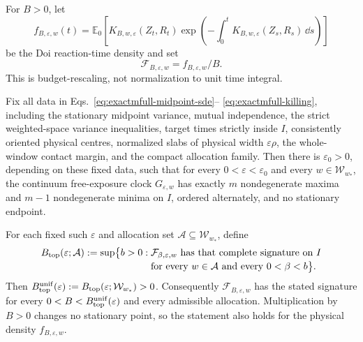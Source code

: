 For \(B>0\), let
\begin{equation}
 f_{B,\varepsilon,w}(t)
 =\mathbb E_0\!\left[
 K_{B,w,\varepsilon}(Z_t,R_t)
 \exp\!\left(-\int_0^tK_{B,w,\varepsilon}(Z_s,R_s)\,\dd s\right)
 \right]
 \label{eq:exactmfull-reaction-density}
\end{equation}
be the Doi reaction-time density and set
\begin{equation}
 \mathcal F_{B,\varepsilon,w}=f_{B,\varepsilon,w}/B.
 \label{eq:exactmfull-rescaled-density}
\end{equation}
This is budget-rescaling, not normalization to unit time integral.

\begin{theorem}
\label{thm:exactmfull-doi}
Fix all data in Eqs.~\eqref{eq:exactmfull-midpoint-sde}--%
\eqref{eq:exactmfull-killing}, including the stationary midpoint variance,
mutual independence, the strict weighted-space variance inequalities, target
times strictly inside \(I\), consistently oriented physical centres,
normalized slabs of physical width \(\varepsilon\rho\), the whole-window
contact margin, and the compact allocation family.  Then there is
\(\varepsilon_0>0\), depending on these fixed data, such that for every
\(0<\varepsilon<\varepsilon_0\) and every
\(w\in\mathcal W_{w_*}\), the continuum free-exposure clock
\(G_{\varepsilon,w}\) has exactly \(m\) nondegenerate maxima and \(m-1\)
nondegenerate minima on \(I\), ordered alternately, and no stationary
endpoint.

For each fixed such \(\varepsilon\) and allocation set
\(\mathcal A\subseteq\mathcal W_{w_*}\), define
\begin{align}
 B_{\rm top}(\varepsilon;\mathcal A)
 :=\sup\bigl\{b>0:\;&
 \mathcal F_{\beta,\varepsilon,w}
 \text{ has that complete signature on }I
 \nonumber\\[-2pt]
 &\text{for every }w\in\mathcal A
 \text{ and every }0<\beta<b\bigr\}.
 \label{eq:exactmfull-btop}
\end{align}
Then
\(B_{\rm top}^{\rm unif}(\varepsilon):=
B_{\rm top}(\varepsilon;\mathcal W_{w_*})>0\).
Consequently \(\mathcal F_{B,\varepsilon,w}\) has the stated signature for
every \(0<B<B_{\rm top}^{\rm unif}(\varepsilon)\) and every admissible
allocation.  Multiplication by \(B>0\) changes no stationary point, so the
statement also holds for the physical density \(f_{B,\varepsilon,w}\).
\end{theorem}

